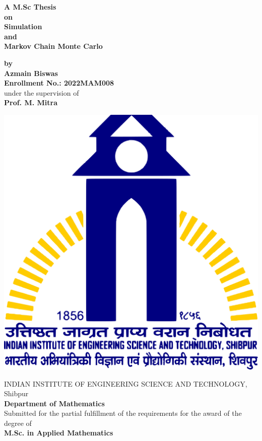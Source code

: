 \begin{titlepage}
    \thispagestyle{empty}
    \begin{center}

        \vspace{1cm}

        \Large{\textbf{A M.Sc Thesis\\ on}}\\
        \vspace{0.5cm}
        \huge{\textbf{Simulation \\ and \\ Markov Chain Monte Carlo}}

        \vspace{1cm}
        \large{\textbf{by}}\\ 
        \Large{\textbf{Azmain Biswas}}\\ 
        \Large{\textbf{Enrollment No.: 2022MAM008}}\\ 
        \Large{under the supervision of}\\ 
        \Large{\textbf{Prof. M. Mitra}}

        \vspace{2cm}

        \includegraphics[scale = 0.1]{images/IIEST_Shibpur_Logo.svg.png}

        \vspace{2cm}

        \Large{{
                INDIAN INSTITUTE OF ENGINEERING SCIENCE AND TECHNOLOGY, Shibpur\\ 
                \textbf{Department of Mathematics}
        }}\\
        \vspace*{2cm}
        \large{{Submitted for the partial fulfillment of the requirements for the award of the degree of}}\\
        \Large{\textbf{M.Sc. in Applied Mathematics}}
    \end{center}
\end{titlepage}
